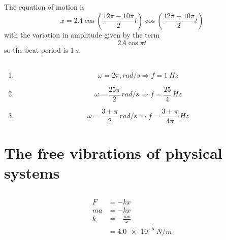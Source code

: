 \documentclass{article}
\begin{document}
\subsection{}

The equation of motion is \[x = 2 A \cos \left( \frac{12 \pi - 10 \pi}{2} t \right) \cos \left( \frac{12 \pi + 10 \pi}{2} t \right)\] with the variation in amplitude given by the term \[2 A \cos \pi t\] so the beat period is $\qty{1}{s}$.

\subsection{}

\begin{enumerate}
  \item \[\omega = 2 \pi, \unit{rad/s} \Rightarrow f = \qty{1}{Hz}\]

  \item \[\omega = \frac{25 \pi}{2} \,\unit{rad/s} \Rightarrow f = \frac{25}{4} \,\unit{Hz}\]

  \item \[\omega = \frac{3 + \pi}{2} \,\unit{rad/s} \Rightarrow f = \frac{3 + \pi}{4 \pi} \,\unit{Hz}\]
\end{enumerate}

\section{The free vibrations of physical systems}

\subsection{}

\begin{align*}
  F   & = -k x              \\
  m a & = -k x              \\
  k   & = -\frac{m a}{x}    \\
      & = \qty{4.0e-5}{N/m}
\end{align*}

\subsection{}
\end{document}
